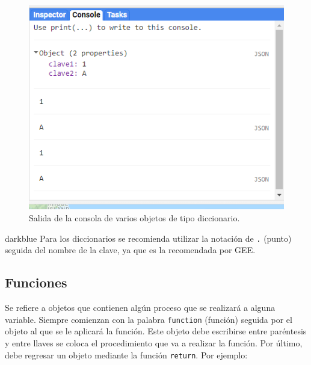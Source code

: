 \documentclass[
  12pt,
  letterpaper,
  twoside]{book}
\begin{document}
\begin{figure}[H]

{\centering \includegraphics[width=0.6\linewidth]{Img/ej3} 

}

\caption{Salida de la consola de varios objetos de tipo diccionario.}\label{fig:f55}
\end{figure}

\begin{bluebox2}

\begin{awesomeblock}{5pt}{\faLightbulb}{darkblue}
Para los diccionarios se recomienda utilizar la notación de \texttt{.} (punto) seguida del nombre de la clave, ya que es la recomendada por GEE.

\end{awesomeblock}

\end{bluebox2}

\hypertarget{funciones}{%
\subsection*{Funciones}\label{funciones}}

Se refiere a objetos que contienen algún proceso que se realizará a alguna variable. Siempre comienzan con la palabra \texttt{function} (función) seguida por el objeto al que se le aplicará la función. Este objeto debe escribirse entre paréntesis y entre llaves se coloca el procedimiento que va a realizar la función. Por último, debe regresar un objeto mediante la función \texttt{return}. Por ejemplo:
\end{document}
